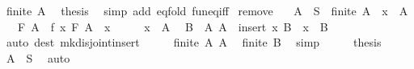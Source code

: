 \begin{isabellebody}
\ {\isacartoucheopen}finite\ A{\isacartoucheclose}\ \isamarkupfalse%
\ {\isacharquery}{\kern0pt}thesis\ \isamarkupfalse%
\ {\isacharparenleft}{\kern0pt}simp\ add{\isacharcolon}{\kern0pt}\ eq{\isacharunderscore}{\kern0pt}fold\ fun{\isacharunderscore}{\kern0pt}eq{\isacharunderscore}{\kern0pt}iff{\isacharparenright}{\kern0pt}\isanewline
{}\isamarkupfalse%
%
\endisatagproof
{\isafoldproof}%
%
\isadelimproof
\isanewline
%
\endisadelimproof
\isanewline
{}\isamarkupfalse%
\ remove{\isacharcolon}{\kern0pt}\isanewline
\ \ \ {\isachardoublequoteopen}A\ {\isasymsubseteq}\ S{\isachardoublequoteclose}\ \ {\isachardoublequoteopen}finite\ A{\isachardoublequoteclose}\ \ {\isachardoublequoteopen}x\ {\isasymin}\ A{\isachardoublequoteclose}\isanewline
\ \ \ {\isachardoublequoteopen}F\ A\ {\isacharequal}{\kern0pt}\ f\ x\ {\isacharparenleft}{\kern0pt}F\ {\isacharparenleft}{\kern0pt}A\ {\isacharminus}{\kern0pt}\ {\isacharbraceleft}{\kern0pt}x{\isacharbraceright}{\kern0pt}{\isacharparenright}{\kern0pt}{\isacharparenright}{\kern0pt}{\isachardoublequoteclose}\isanewline
%
\isadelimproof
%
\endisadelimproof
%
\isatagproof
{}\isamarkupfalse%
\ {\isacharminus}{\kern0pt}\isanewline
\ \ \isamarkupfalse%
\ {\isacartoucheopen}x\ {\isasymin}\ A{\isacartoucheclose}\ \isamarkupfalse%
\ B\ \ A{\isacharcolon}{\kern0pt}\ {\isachardoublequoteopen}A\ {\isacharequal}{\kern0pt}\ insert\ x\ B{\isachardoublequoteclose}\ \ {\isachardoublequoteopen}x\ {\isasymnotin}\ B{\isachardoublequoteclose}\isanewline
\ \ \ \ \isamarkupfalse%
\ {\isacharparenleft}{\kern0pt}auto\ dest{\isacharcolon}{\kern0pt}\ mk{\isacharunderscore}{\kern0pt}disjoint{\isacharunderscore}{\kern0pt}insert{\isacharparenright}{\kern0pt}\isanewline
\ \ \isamarkupfalse%
\ \isamarkupfalse%
\ {\isacartoucheopen}finite\ A{\isacartoucheclose}\ A\ \isamarkupfalse%
\ {\isachardoublequoteopen}finite\ B{\isachardoublequoteclose}\ \isamarkupfalse%
\ simp\isanewline
\ \ \isamarkupfalse%
\ \isamarkupfalse%
\ {\isacharquery}{\kern0pt}thesis\isanewline
\ \ \ \ \isamarkupfalse%
\ {\isacartoucheopen}A\ {\isasymsubseteq}\ S{\isacartoucheclose}\ \isamarkupfalse%
\ auto\isanewline
{}\isamarkupfalse%
%
\endisatagproof
{\isafoldproof}%
%
\isadelimproof
\isanewline
%
\endisadelimproof

\end{isabellebody}
